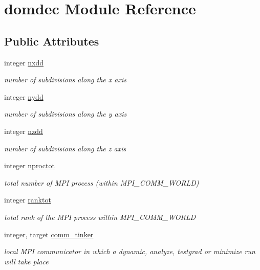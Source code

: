 \hypertarget{classdomdec}{\section{domdec Module Reference}
\label{classdomdec}
}
\subsection*{Public Attributes}
\begin{DoxyCompactItemize}
\item 
integer \hyperlink{classdomdec_a867d499309342702baee7bd2f4dd72ae}{nxdd}
\begin{DoxyCompactList}\small\item\em number of subdivisions along the x axis \end{DoxyCompactList}\item 
integer \hyperlink{classdomdec_a6811e1e01bd9ca743778b5dd16be7675}{nydd}
\begin{DoxyCompactList}\small\item\em number of subdivisions along the y axis \end{DoxyCompactList}\item 
integer \hyperlink{classdomdec_ae136589c89f0840e0c70674031d3b777}{nzdd}
\begin{DoxyCompactList}\small\item\em number of subdivisions along the z axis \end{DoxyCompactList}\item 
integer \hyperlink{classdomdec_a77ce93de77d93f248287dfd4f89e64cc}{nproctot}
\begin{DoxyCompactList}\small\item\em total number of M\-P\-I process (within M\-P\-I\-\_\-\-C\-O\-M\-M\-\_\-\-W\-O\-R\-L\-D) \end{DoxyCompactList}\item 
integer \hyperlink{classdomdec_a003bab60bea2de6201a9182da660c5c8}{ranktot}
\begin{DoxyCompactList}\small\item\em total rank of the M\-P\-I process within M\-P\-I\-\_\-\-C\-O\-M\-M\-\_\-\-W\-O\-R\-L\-D \end{DoxyCompactList}\item 
integer, target \hyperlink{classdomdec_a1c86489abc12bf273ebe35d2e95e5a97}{comm\-\_\-tinker}
\begin{DoxyCompactList}\small\item\em local M\-P\-I communicator in which a dynamic, analyze, testgrad or minimize run will take place \end{DoxyCompactList}\item 

\end{DoxyCompactItemize}
